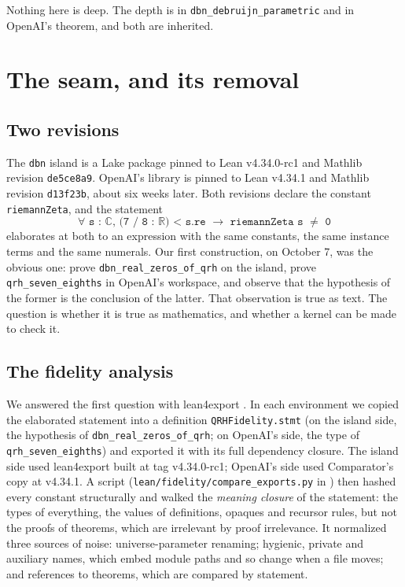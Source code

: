 \documentclass[11pt]{article}
\theoremstyle{definition}
\newcommand{\lean}[1]{\texttt{#1}}
\newcommand{\C}{\mathbb{C}}
\newcommand{\R}{\mathbb{R}}
\begin{document}
Nothing here is deep. The depth is in \lean{dbn\_debruijn\_parametric} and in OpenAI's theorem, and both are inherited.

\section{The seam, and its removal}\label{sec:seam}

\subsection{Two revisions}

The \lean{dbn} island is a Lake package pinned to Lean v4.34.0-rc1 and Mathlib revision \lean{de5ce8a9}. OpenAI's library is pinned to Lean v4.34.1 and Mathlib revision \lean{d13f23b}, about six weeks later. Both revisions declare the constant \lean{riemannZeta}, and the statement
\[
\lean{$\forall$ s : $\C$, (7 / 8 : $\R$) < s.re $\to$ riemannZeta s $\neq$ 0}
\]
elaborates at both to an expression with the same constants, the same instance terms and the same numerals. Our first construction, on October 7, was the obvious one: prove \lean{dbn\_real\_zeros\_of\_qrh} on the island, prove \lean{qrh\_seven\_eighths} in OpenAI's workspace, and observe that the hypothesis of the former is the conclusion of the latter. That observation is true as text. The question is whether it is true as mathematics, and whether a kernel can be made to check it.

\subsection{The fidelity analysis}

We answered the first question with lean4export \cite{l4x}. In each environment we copied the elaborated statement into a definition \lean{QRHFidelity.stmt} (on the island side, the hypothesis of \lean{dbn\_real\_zeros\_of\_qrh}; on OpenAI's side, the type of \lean{qrh\_seven\_eighths}) and exported it with its full dependency closure. The island side used lean4export built at tag v4.34.0-rc1; OpenAI's side used Comparator's copy at v4.34.1. A script (\lean{lean/fidelity/compare\_exports.py} in \cite{Repo}) then hashed every constant structurally and walked the \emph{meaning closure} of the statement: the types of everything, the values of definitions, opaques and recursor rules, but not the proofs of theorems, which are irrelevant by proof irrelevance. It normalized three sources of noise: universe-parameter renaming; hygienic, private and auxiliary names, which embed module paths and so change when a file moves; and references to theorems, which are compared by statement.
\end{document}
